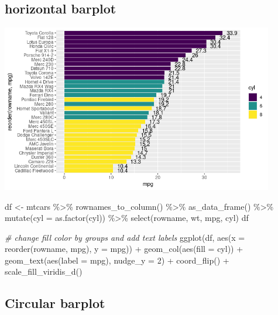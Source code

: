 \documentclass[
]{book}
\newenvironment{Shaded}{\begin{snugshade}}{\end{snugshade}}
\newcommand{\AttributeTok}[1]{\textcolor[rgb]{0.77,0.63,0.00}{#1}}
\newcommand{\CommentTok}[1]{\textcolor[rgb]{0.56,0.35,0.01}{\textit{#1}}}
\newcommand{\DecValTok}[1]{\textcolor[rgb]{0.00,0.00,0.81}{#1}}
\newcommand{\FunctionTok}[1]{\textcolor[rgb]{0.00,0.00,0.00}{#1}}
\newcommand{\NormalTok}[1]{#1}
\newcommand{\OtherTok}[1]{\textcolor[rgb]{0.56,0.35,0.01}{#1}}
\newcommand{\SpecialCharTok}[1]{\textcolor[rgb]{0.00,0.00,0.00}{#1}}
\begin{document}
\hypertarget{horizontal-barplot}{%
\subsection{horizontal barplot}\label{horizontal-barplot}}

\includegraphics[width=4.6875in,height=\textheight]{images/10/00000b.png}

\begin{Shaded}
\begin{Highlighting}[]
\NormalTok{df }\OtherTok{\textless{}{-}}\NormalTok{ mtcars }\SpecialCharTok{\%\textgreater{}\%}
  \FunctionTok{rownames\_to\_column}\NormalTok{() }\SpecialCharTok{\%\textgreater{}\%}
  \FunctionTok{as\_data\_frame}\NormalTok{() }\SpecialCharTok{\%\textgreater{}\%}
  \FunctionTok{mutate}\NormalTok{(}\AttributeTok{cyl =} \FunctionTok{as.factor}\NormalTok{(cyl)) }\SpecialCharTok{\%\textgreater{}\%}
  \FunctionTok{select}\NormalTok{(rowname, wt, mpg, cyl)}
\NormalTok{df}

\CommentTok{\# change fill color by groups and add text labels}
\FunctionTok{ggplot}\NormalTok{(df, }\FunctionTok{aes}\NormalTok{(}\AttributeTok{x =} \FunctionTok{reorder}\NormalTok{(rowname, mpg), }\AttributeTok{y =}\NormalTok{ mpg)) }\SpecialCharTok{+}
  \FunctionTok{geom\_col}\NormalTok{(}\FunctionTok{aes}\NormalTok{(}\AttributeTok{fill =}\NormalTok{ cyl)) }\SpecialCharTok{+} 
  \FunctionTok{geom\_text}\NormalTok{(}\FunctionTok{aes}\NormalTok{(}\AttributeTok{label =}\NormalTok{ mpg), }\AttributeTok{nudge\_y =} \DecValTok{2}\NormalTok{) }\SpecialCharTok{+} 
  \FunctionTok{coord\_flip}\NormalTok{() }\SpecialCharTok{+}
  \FunctionTok{scale\_fill\_viridis\_d}\NormalTok{()}
\end{Highlighting}
\end{Shaded}

\hypertarget{circular-barplot}{%
\subsection{Circular barplot}\label{circular-barplot}}
\end{document}
